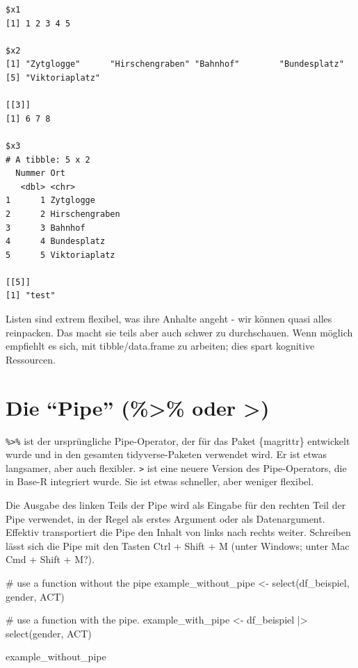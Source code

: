 \documentclass[
  letterpaper,
  DIV=11,
  numbers=noendperiod]{scrreprt}
\newenvironment{Shaded}{\begin{snugshade}}{\end{snugshade}}
\newcommand{\CommentTok}[1]{\textcolor[rgb]{0.37,0.37,0.37}{#1}}
\newcommand{\FunctionTok}[1]{\textcolor[rgb]{0.28,0.35,0.67}{#1}}
\newcommand{\NormalTok}[1]{\textcolor[rgb]{0.00,0.23,0.31}{#1}}
\newcommand{\OtherTok}[1]{\textcolor[rgb]{0.00,0.23,0.31}{#1}}
\newcommand{\SpecialCharTok}[1]{\textcolor[rgb]{0.37,0.37,0.37}{#1}}
\begin{document}
\begin{verbatim}
$x1
[1] 1 2 3 4 5

$x2
[1] "Zytglogge"      "Hirschengraben" "Bahnhof"        "Bundesplatz"   
[5] "Viktoriaplatz" 

[[3]]
[1] 6 7 8

$x3
# A tibble: 5 x 2
  Nummer Ort           
   <dbl> <chr>         
1      1 Zytglogge     
2      2 Hirschengraben
3      3 Bahnhof       
4      4 Bundesplatz   
5      5 Viktoriaplatz 

[[5]]
[1] "test"
\end{verbatim}

Listen sind extrem flexibel, was ihre Anhalte angeht - wir können quasi
alles reinpacken. Das macht sie teils aber auch schwer zu durchschauen.
Wenn möglich empfiehlt es sich, mit tibble/data.frame zu arbeiten; dies
spart kognitive Ressourcen.

\section{Die ``Pipe'' (\%\textgreater\% oder
\textbar\textgreater)}\label{die-pipe-oder}

\texttt{\%\textgreater{}\%} ist der ursprüngliche Pipe-Operator, der für
das Paket \{magrittr\} entwickelt wurde und in den gesamten
tidyverse-Paketen verwendet wird. Er ist etwas langsamer, aber auch
flexibler. \texttt{\textbar{}\textgreater{}} ist eine neuere Version des
Pipe-Operators, die in Base-R integriert wurde. Sie ist etwas schneller,
aber weniger flexibel.

Die Ausgabe des linken Teils der Pipe wird als Eingabe für den rechten
Teil der Pipe verwendet, in der Regel als erstes Argument oder als
Datenargument. Effektiv transportiert die Pipe den Inhalt von links nach
rechts weiter. Schreiben lässt sich die Pipe mit den Tasten Ctrl + Shift
+ M (unter Windows; unter Mac Cmd + Shift + M?).

\begin{Shaded}
\begin{Highlighting}[]
\CommentTok{\# use a function without the pipe}
\NormalTok{example\_without\_pipe }\OtherTok{\textless{}{-}} \FunctionTok{select}\NormalTok{(df\_beispiel, gender, ACT)}

\CommentTok{\# use a function with the pipe. }
\NormalTok{example\_with\_pipe }\OtherTok{\textless{}{-}}\NormalTok{ df\_beispiel }\SpecialCharTok{|\textgreater{}} 
  \FunctionTok{select}\NormalTok{(gender, ACT)}


\NormalTok{example\_without\_pipe}
\end{Highlighting}
\end{Shaded}
\end{document}
